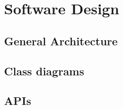 \chapter{Software Design}

\section{General Architecture}

\section{Class diagrams}

\section{APIs}

